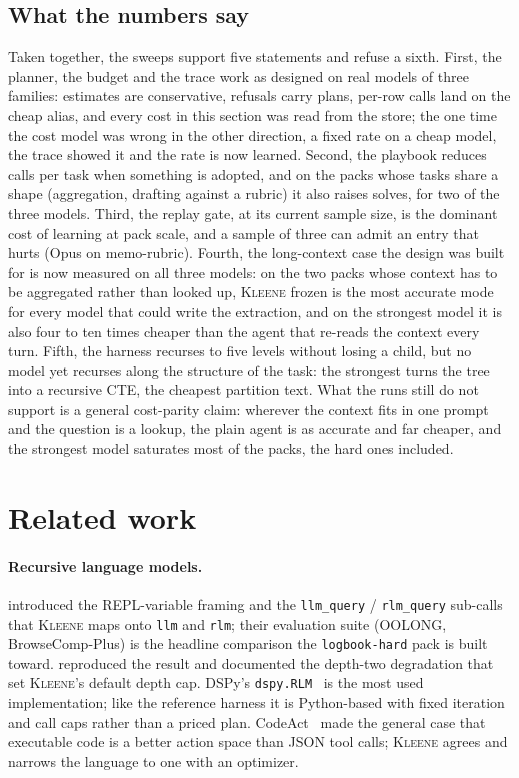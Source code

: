 \documentclass[11pt,a4paper]{article}
\newcommand{\kleene}{\textsc{Kleene}}
\newcommand{\code}[1]{\texttt{#1}}
\begin{document}
\FloatBarrier
\subsection{What the numbers say}

Taken together, the sweeps support five statements and refuse a sixth.
First, the planner, the budget and the trace work as designed on real models
of three families: estimates are conservative, refusals carry plans, per-row
calls land on the cheap alias, and every cost in this section was read from
the store; the one time the cost model was wrong in the other direction, a
fixed rate on a cheap model, the trace showed it and the rate is now
learned. Second, the playbook reduces calls per task when something is
adopted, and on the packs whose tasks share a shape (aggregation, drafting
against a rubric) it also raises solves, for two of the three models.
Third, the replay gate, at its current sample size, is the dominant cost of
learning at pack scale, and a sample of three can admit an entry that hurts
(Opus on memo-rubric). Fourth, the long-context case the design was built
for is now measured on all three models: on the two packs whose context
has to be aggregated rather than looked up, \kleene{} frozen is the most
accurate mode for every model that could write the extraction, and on the
strongest model it is also four to ten times cheaper than the agent that
re-reads the context every turn. Fifth, the harness recurses to five levels
without losing a child, but no model yet recurses along the structure of
the task: the strongest turns the tree into a recursive CTE, the cheapest
partition text. What the runs still do not support is a general cost-parity
claim: wherever the context fits in one prompt and the question is a lookup,
the plain agent is as accurate and far cheaper, and the strongest model
saturates most of the packs, the hard ones included.

\FloatBarrier
\section{Related work}
\label{sec:related}

\paragraph{Recursive language models.} \citet{zhang2025rlm} introduced the
REPL-variable framing and the \code{llm\_query} / \code{rlm\_query} sub-calls that
\kleene{} maps onto \code{llm} and \code{rlm}; their evaluation suite (OOLONG,
BrowseComp-Plus) is the headline comparison the \code{logbook-hard} pack is
built toward. \citet{wang2026reproducing} reproduced the result and documented
the depth-two degradation that set \kleene's default depth cap. DSPy's
\code{dspy.RLM}~\citep{khattab2023dspy} is the most used implementation; like
the reference harness it is Python-based with fixed iteration and call caps
rather than a priced plan. CodeAct~\citep{wang2024codeact} made the general case
that executable code is a better action space than JSON tool calls; \kleene{}
agrees and narrows the language to one with an optimizer.
\end{document}
